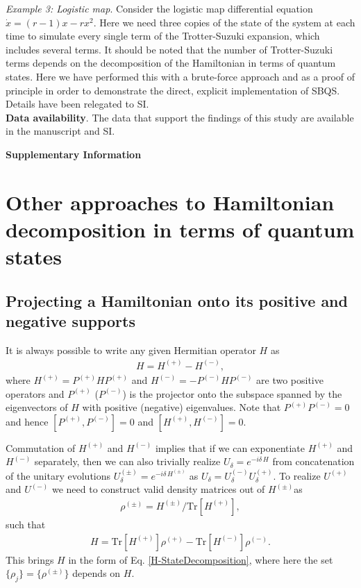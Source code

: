 \documentclass[aps,pra,twocolumn,floatfix,groupedaddress,superscriptaddress,nofootinbib,notitlepage]{revtex4-2}
\begin{document}
\textit{Example 3: Logistic map}. Consider the logistic map differential equation $\dot{x}= (r-1) x-r x^{2}$. Here we need three copies of the state of the system at each time to simulate every single term of the Trotter-Suzuki expansion, which includes several terms. It should be noted that the number of Trotter-Suzuki terms depends on the decomposition of the Hamiltonian in terms of quantum states. Here we have performed this with a brute-force approach and as a proof of principle in order to demonstrate the direct, explicit implementation of SBQS. Details have been relegated to SI.\\

\textbf{Data availability}. The data that support the findings of this study are available in the manuscript and SI.

\clearpage
\begin{center}
\textbf{Supplementary Information}
\end{center}
\setcounter{section}{0}
\section{Other approaches to Hamiltonian decomposition in terms of quantum states}
\label{app:others}

\subsection{Projecting a Hamiltonian onto its positive and negative supports}

It is always possible to write any given Hermitian operator $H$ as 
\begin{align}
H=H^{(+)}-H^{(-)},
\end{align}
where $H^{(+)}=P^{(+)} H P^{(+)}$ and $H^{(-)}=-P^{(-)} H P^{(-)}$ are two positive operators and $P^{(+)}$ ($P^{(-)}$) is the projector onto the subspace spanned by the eigenvectors of $H$ with positive (negative) eigenvalues. Note that $P^{(+)}P^{(-)}=0$ and hence $[P^{(+)},P^{(-)}]=0$ and $[ H^{(+)}, H^{(-)}]=0$.

Commutation of $H^{(+)}$ and $H^{(-)}$ implies that if we can exponentiate $H^{(+)}$ and $H^{(-)}$ separately, then we can also trivially realize $U_{\delta} = e^{-i\delta \,H}$ from concatenation of the unitary evolutions $U_{\delta}^{(\pm)}=e^{-i\delta \, H^{(\pm)}}$ as $U_{\delta}=U_{\delta}^{(-)} U^{(+)}_{\delta}$. To realize $U^{(+)}$ and $U^{(-)}$ we need to construct valid density matrices out of $H^{(\pm)}$as 
\begin{align}
\rho^{(\pm)}= H^{(\pm)}/\mathrm{Tr}[ H^{(+)}],
\end{align}
 such that 
\begin{align}
H=\mathrm{Tr}[ H^{(+)}]\rho^{(+)} - \mathrm{Tr}[ H^{(-)}]\rho^{(-)}.
\end{align} 
This brings $H$ in the form of Eq. \eqref{H-StateDecomposition}, where here the set $\{\rho_{j}\}=\{\rho^{(\pm)}\}$ depends on $H$.
\end{document}
